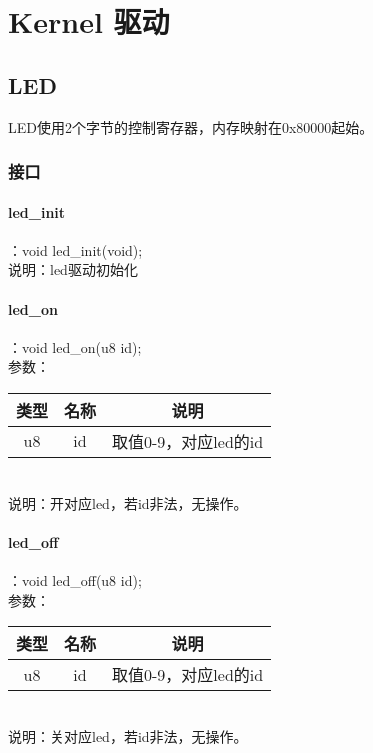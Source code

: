 %
%
%
%
%
%
%
%

\chapter{Kernel 驱动}
\section{LED}
LED使用2个字节的控制寄存器，内存映射在0x80000起始。
\subsection{接口}

\subsubsection{led\_init}
：void led\_init(void);\\
说明：led驱动初始化

\subsubsection{led\_on}
：void led\_on(u8 id);\\
参数：\\
\begin{tabular}{|c|c|c|}
    \hline
    类型 & 名称 & 说明\\\hline
    u8 & id & 取值0-9，对应led的id\\\hline
\end{tabular}\\
说明：开对应led，若id非法，无操作。

\subsubsection{led\_off}
：void led\_off(u8 id);\\
参数：\\
\begin{tabular}{|c|c|c|}
    \hline
    类型 & 名称 & 说明\\\hline
    u8 & id & 取值0-9，对应led的id\\\hline
\end{tabular}\\
说明：关对应led，若id非法，无操作。

